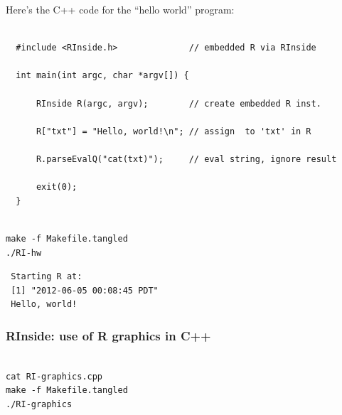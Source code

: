 \documentclass[11pt]{article}
\begin{document}
Here's the C++ code for the ``hello world'' program:


\begin{verbatim}
  
  #include <RInside.h>              // embedded R via RInside
  
  int main(int argc, char *argv[]) {
  
      RInside R(argc, argv);        // create embedded R inst.
  
      R["txt"] = "Hello, world!\n"; // assign  to 'txt' in R
  
      R.parseEvalQ("cat(txt)");     // eval string, ignore result
  
      exit(0);
  }
\end{verbatim}



\begin{verbatim}

make -f Makefile.tangled
./RI-hw
\end{verbatim}

\begin{verbatim}
 Starting R at:
 [1] "2012-06-05 00:08:45 PDT"
 Hello, world!
\end{verbatim}
\subsubsection{RInside: use of R graphics in C++}
\label{sec-3-2-2}





\begin{verbatim}

cat RI-graphics.cpp
make -f Makefile.tangled
./RI-graphics
\end{verbatim}
\end{document}
